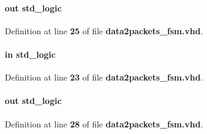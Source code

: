 \paragraph[{pct\+\_\+buff\+\_\+wr\+\_\+dis}]{ {\bfseries \textcolor{keywordflow}{out}\textcolor{vhdlchar}{ }} {\bfseries \textcolor{comment}{std\+\_\+logic}\textcolor{vhdlchar}{ }} \hspace{0.3cm}{\ttfamily [Port]}}\label{classdata2packets__fsm_ab4d3be8a660a6e8755eb48e6248cd27e}


Definition at line {\bf 25} of file {\bf data2packets\+\_\+fsm.\+vhd}.

\paragraph[{reset\+\_\+n}]{ {\bfseries \textcolor{keywordflow}{in}\textcolor{vhdlchar}{ }} {\bfseries \textcolor{comment}{std\+\_\+logic}\textcolor{vhdlchar}{ }} \hspace{0.3cm}{\ttfamily [Port]}}\label{classdata2packets__fsm_a446ea52ed8c4a84181a47d9165ce41a5}


Definition at line {\bf 23} of file {\bf data2packets\+\_\+fsm.\+vhd}.

\paragraph[{smpl\+\_\+buff\+\_\+rdreq}]{ {\bfseries \textcolor{keywordflow}{out}\textcolor{vhdlchar}{ }} {\bfseries \textcolor{comment}{std\+\_\+logic}\textcolor{vhdlchar}{ }} \hspace{0.3cm}{\ttfamily [Port]}}\label{classdata2packets__fsm_aab9bf8ed90bf34ef793eb8051d55ce6a}


Definition at line {\bf 28} of file {\bf data2packets\+\_\+fsm.\+vhd}.

